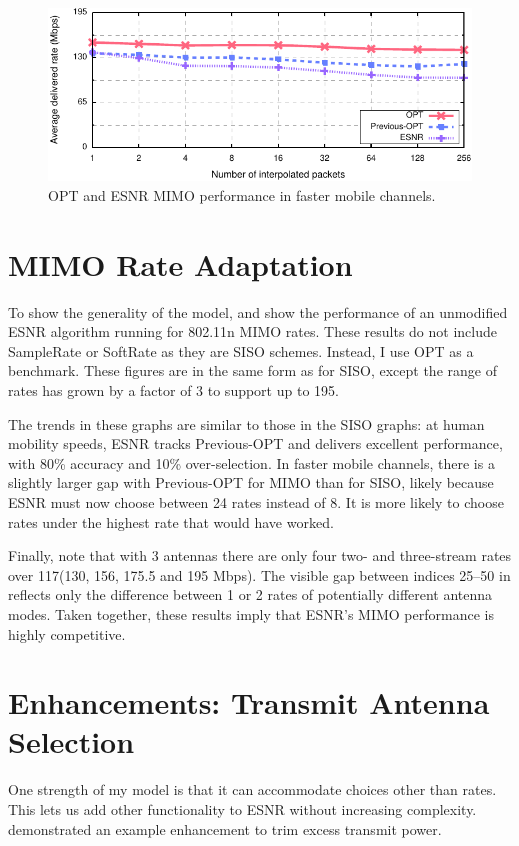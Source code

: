 \begin{figure}[ht]
      \centering
      \includegraphics[width=\textwidth]{figures/rate/mimo_rate_skip.pdf}
      \caption{\label{fig:mimo_eff_snr_speedup} OPT and ESNR MIMO performance in faster mobile channels.}
\end{figure}

\section{MIMO Rate Adaptation}
To show the generality of the model,  and  show the performance of an unmodified ESNR algorithm running for 802.11n MIMO rates. These results do not include SampleRate or SoftRate as they are SISO schemes. Instead, I use OPT as a benchmark.
These figures are in the same form as for SISO, except the range of rates has grown by a factor of 3 to support up to 195\Mbps. 

The trends in these graphs are similar to those in the SISO graphs: at human mobility speeds, ESNR tracks Previous-OPT and delivers excellent performance, with 80\% accuracy and 10\% over-selection. In faster mobile channels, there is a slightly larger gap with Previous-OPT for MIMO than for SISO, likely because ESNR must now choose between 24 rates instead of 8. It is more likely to choose rates under the highest rate that would have worked. 

Finally, note that with 3 antennas there are only four two- and three-stream rates over 117\Mbps (130, 156, 175.5 and 195 Mbps). The visible gap between indices 25--50 in  reflects only the difference between 1 or 2 rates of potentially different antenna modes. Taken together, these results imply that ESNR's MIMO performance is highly competitive.


\section{Enhancements: Transmit Antenna Selection}
One strength of my model is that it can accommodate choices other than rates. This lets us add other functionality to ESNR without increasing complexity.  demonstrated an example enhancement to trim excess transmit power.

